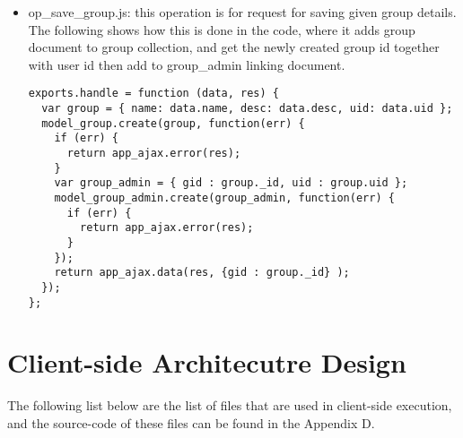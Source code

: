 \begin{itemize}
\item op{\_}save{\_}group.js: this operation is for request for saving given group details. The following shows how this is done in the code, where it adds group document to group collection, and get the newly created group id together with user id then add to group{\_}admin linking document. 

\begin{lstlisting}
exports.handle = function (data, res) {
  var group = { name: data.name, desc: data.desc, uid: data.uid };
  model_group.create(group, function(err) {
    if (err) {
      return app_ajax.error(res);
    }
    var group_admin = { gid : group._id, uid : group.uid };
    model_group_admin.create(group_admin, function(err) {
      if (err) {
        return app_ajax.error(res);
      }      
    });
    return app_ajax.data(res, {gid : group._id} );
  });
};
\end{lstlisting}

\end{itemize}

\section{Client-side Architecutre Design}
The following list below are the list of files that are used in client-side execution, and the source-code of these files can be found in the Appendix D.

